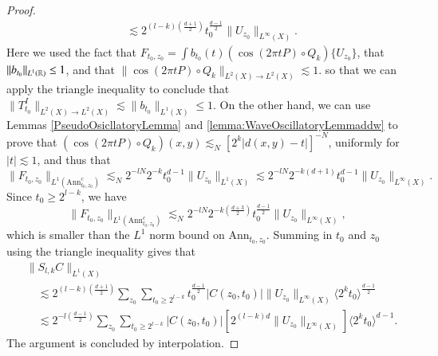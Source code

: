 \begin{proof}
\begin{align*}
        &\lesssim 2^{(l-k) \left( \frac{d+1}{2}\right)} t_0^{\frac{d-1}{2}} \| U_{z_0} \|_{L^\infty(X)}.
    \end{align*}
    Here we used the fact that $F_{t_0,z_0} = \int b_{t_0}(t) ( \cos(2 \pi t P) \circ Q_k ) \{ U_{z_0} \}$, that $\| b_{t_0} \|_{L^1(\operatorname{\mathbb{R}})} \leq 1$,  and that $\| \cos(2 \pi t P) \circ Q_k \|_{L^2(X) \to L^2(X)} \lesssim 1$. so that we can apply the triangle inequality to conclude that $\| T_{t_0}^I \|_{L^2(X) \to L^2(X)} \lesssim \| b_{t_0} \|_{L^1(X)} \leq 1$. On the other hand, we can use Lemmas \ref{PseudoOsicllatoryLemma} and \ref{lemma:WaveOscillatoryLemmaddw} to prove that $(\cos(2 \pi t P) \circ Q_k)(x,y) \lesssim_N [2^k |d(x,y) - t|]^{-N}$, uniformly for $|t| \lesssim 1$, and thus that
    \[ \| F_{t_0,z_0} \|_{L^1(\text{Ann}_{t_0,z_0}^c)} \lesssim_N 2^{-lN} 2^{-k} t_0^{d-1} \| U_{z_0} \|_{L^1(X)} \lesssim 2^{-lN} 2^{-k(d+1)} t_0^{d-1} \| U_{z_0} \|_{L^\infty(X)}. \]
    Since $t_0 \geq 2^{l-k}$, we have
    \[ \| F_{t_0,z_0} \|_{L^1(\text{Ann}_{t_0,z_0}^c)} \lesssim_N 2^{-lN} 2^{-k \left( \frac{d+3}{2} \right)} t_0^{\frac{d-1}{2}} \| U_{z_0} \|_{L^\infty(X)}, \]
    which is smaller than the $L^1$ norm bound on $\text{Ann}_{t_0,z_0}$.
    Summing in $t_0$ and $z_0$ using the triangle inequality gives that
    \begin{align*}
        &\| S_{l,k} C \|_{L^1(X)}\\
        &\quad \lesssim 2^{(l-k) \left( \frac{d+1}{2}\right)} \sum\nolimits_{z_0} \sum\nolimits_{t_0 \geq 2^{l-k}} t_0^{\frac{d-1}{2}} |C(z_0,t_0)| \| U_{z_0} \|_{L^\infty(X)} \langle 2^k t_0 \rangle^{\frac{d-1}{2}}\\
        &\quad \lesssim 2^{-l \left( \frac{d-1}{2} \right)} \sum\nolimits_{z_0} \sum\nolimits_{t_0 \geq 2^{l-k}} |C(z_0,t_0)| \left[  2^{(l-k)d} \| U_{z_0} \|_{L^\infty(X)}\right] \langle 2^k t_0 \rangle^{d-1}.
    \end{align*}
    The argument is concluded by interpolation.
\end{proof}

